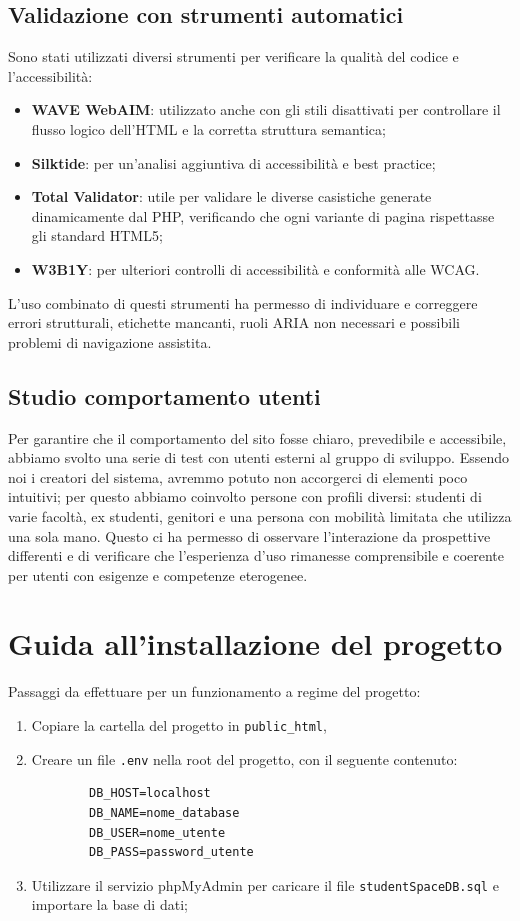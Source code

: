 \documentclass[a4paper,12pt]{article}
\begin{document}
\subsection{Validazione con strumenti automatici}
Sono stati utilizzati diversi strumenti per verificare la qualità del codice e l’accessibilità:
\begin{itemize}
    \item \textbf{WAVE WebAIM}: utilizzato anche con gli stili disattivati per controllare il flusso logico dell’HTML e la corretta struttura semantica;
    \item \textbf{Silktide}: per un’analisi aggiuntiva di accessibilità e best practice;
    \item \textbf{Total Validator}: utile per validare le diverse casistiche generate dinamicamente dal PHP, verificando che ogni variante di pagina rispettasse gli standard HTML5;
    \item \textbf{W3B1Y}: per ulteriori controlli di accessibilità e conformità alle WCAG.
\end{itemize}

L’uso combinato di questi strumenti ha permesso di individuare e correggere errori strutturali, etichette mancanti, ruoli ARIA non necessari e possibili problemi di navigazione assistita.

\subsection{Studio comportamento utenti}
Per garantire che il comportamento del sito fosse chiaro, prevedibile e accessibile, abbiamo svolto una serie di test con utenti esterni al gruppo di sviluppo. Essendo noi i creatori del sistema, avremmo potuto non accorgerci di elementi poco intuitivi; per questo abbiamo coinvolto persone con profili diversi: studenti di varie facoltà, ex studenti, genitori e una persona con mobilità limitata che utilizza una sola mano. Questo ci ha permesso di osservare l’interazione da prospettive differenti e di verificare che l’esperienza d’uso rimanesse comprensibile e coerente per utenti con esigenze e competenze eterogenee.

\section{Guida all’installazione del progetto}
Passaggi da effettuare per un funzionamento a regime del progetto:
\begin {enumerate}
    \item Copiare la cartella del progetto in \texttt{public\_html},
    \item Creare un file \texttt{.env} nella root del progetto, con il seguente contenuto:
    \begin{verbatim}
        DB_HOST=localhost
        DB_NAME=nome_database
        DB_USER=nome_utente
        DB_PASS=password_utente
    \end{verbatim}
    \item Utilizzare il servizio phpMyAdmin per caricare il file \texttt{studentSpaceDB.sql} e importare la base di dati;
\end{enumerate}
\end{document}
